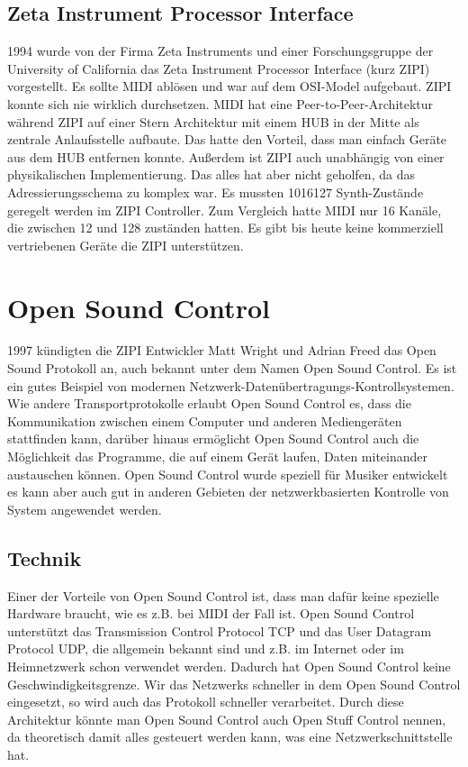 \documentclass[a4paper, 12pt]{article}
\begin{document}
\subsection {Zeta Instrument Processor Interface}
1994 wurde von der Firma Zeta Instruments und einer Forschungsgruppe der University of California das Zeta Instrument Processor Interface (kurz ZIPI) vorgestellt. Es sollte MIDI ablösen und war auf dem OSI-Model aufgebaut. ZIPI konnte sich nie wirklich durchsetzen. MIDI hat eine Peer-to-Peer-Architektur während ZIPI auf einer Stern Architektur mit einem HUB in der Mitte als zentrale Anlaufsstelle aufbaute. Das hatte den Vorteil, dass man einfach Geräte aus dem HUB entfernen konnte. Außerdem ist ZIPI auch unabhängig von einer physikalischen Implementierung. Das alles hat aber nicht geholfen, da das Adressierungsschema zu komplex war. Es mussten 1016127 Synth-Zustände geregelt werden im ZIPI Controller. Zum Vergleich hatte MIDI nur 16 Kanäle, die zwischen 12 und 128 zuständen hatten.
Es gibt bis heute keine kommerziell vertriebenen Geräte die ZIPI unterstützen.
\newpage
\section{Open Sound Control}
1997 kündigten die ZIPI Entwickler Matt Wright und Adrian Freed das Open Sound Protokoll an, auch bekannt unter dem Namen Open Sound Control. Es ist ein gutes Beispiel von modernen Netzwerk-Datenübertragungs-Kontrollsystemen. Wie andere Transportprotokolle erlaubt Open Sound Control es, dass die Kommunikation zwischen einem Computer und anderen Mediengeräten stattfinden kann, darüber hinaus ermöglicht Open Sound Control auch die Möglichkeit das Programme, die auf einem Gerät laufen, Daten miteinander austauschen können. Open Sound Control wurde speziell für Musiker entwickelt es kann aber auch gut in anderen Gebieten der netzwerkbasierten Kontrolle von System angewendet werden.

\subsection{Technik}
Einer der Vorteile von Open Sound Control ist, dass man dafür keine spezielle Hardware braucht, wie es z.B. bei MIDI der Fall ist. Open Sound Control unterstützt das Transmission Control Protocol TCP und das User Datagram Protocol UDP, die allgemein bekannt sind und z.B. im Internet oder im Heimnetzwerk schon verwendet werden. Dadurch hat Open Sound Control keine Geschwindigkeitsgrenze. Wir das Netzwerks schneller in dem Open Sound Control eingesetzt, so wird auch das Protokoll schneller verarbeitet. Durch diese Architektur könnte man Open Sound Control auch Open Stuff Control nennen, da theoretisch damit alles gesteuert werden kann, was eine Netzwerkschnittstelle hat.
\end{document}
